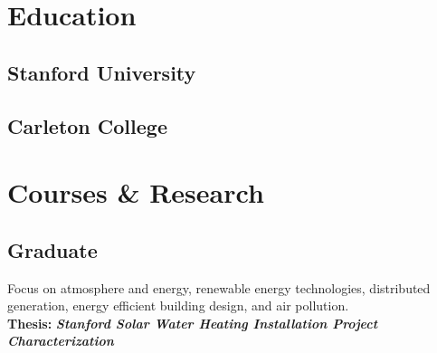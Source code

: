 \documentclass[]{deedy-resume-openfont}
\begin{document}
%
%


%
%

%
%

\begin{minipage}[t]{0.33\textwidth} 


\section{Education} 

\subsection{Stanford University}
\sectionsep

\subsection{Carleton College}
\sectionsep


\section{Courses \& Research}
\subsection{Graduate}
Focus on atmosphere and energy, renewable energy technologies, distributed generation, energy efficient building design, and air pollution.\\
{\footnotesize{\textbf{Thesis:}}} 
{\footnotesize \textit{\textbf{Stanford Solar Water Heating Installation Project Characterization}}}
\sectionsep


\end{minipage}
\end{document}
